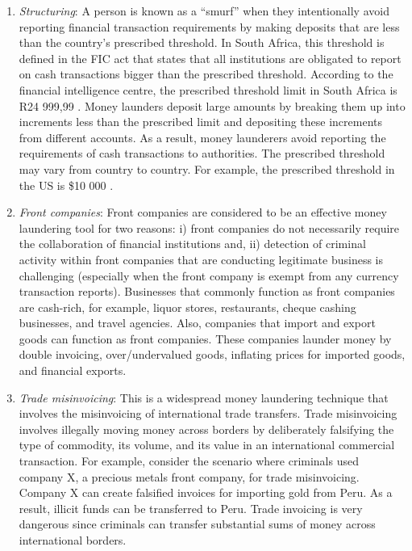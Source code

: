 \begin{enumerate}

\item \textit{Structuring}: A person is known as a ``smurf'' when they intentionally avoid reporting financial transaction requirements by making deposits that are less than the country's prescribed threshold. In South Africa, this threshold is defined in the FIC act that states that all institutions are obligated to report on cash transactions bigger than the prescribed threshold. According to the financial intelligence centre, the prescribed threshold limit in South Africa is R24 999,99 \citep*{fic2001}. Money launders deposit large amounts by breaking them up into increments less than the prescribed limit and depositing these increments from different accounts. As a result, money launderers avoid reporting the requirements of cash transactions to authorities. The prescribed threshold may vary from country to country. For example, the prescribed threshold in the US is \$10 000 \citep*{yale2021reporting}.        

\item \textit{Front companies}: Front companies are considered to be an effective money laundering tool for two reasons: i) front companies do not necessarily require the collaboration of financial institutions and, ii) detection of criminal activity within front companies that are conducting legitimate business is challenging (especially when the front company is exempt from any currency transaction reports). Businesses that commonly function as front companies are cash-rich, for example, liquor stores, restaurants, cheque cashing businesses, and travel agencies. Also, companies that import and export goods can function as front companies. These companies launder money by double invoicing, over/undervalued goods, inflating prices for imported goods, and financial exports.

\item \textit{Trade misinvoicing}: This is a widespread money laundering technique that involves the misinvoicing of international trade transfers. Trade misinvoicing involves illegally moving money across borders by deliberately falsifying the type of commodity, its volume, and its value in an international commercial transaction. For example, consider the scenario where criminals used company X, a precious metals front company, for trade misinvoicing. Company X can create falsified invoices for importing gold from Peru. As a result, illicit funds can be transferred to Peru. Trade invoicing is very dangerous since criminals can transfer substantial sums of money across international borders.  


\end{enumerate}
